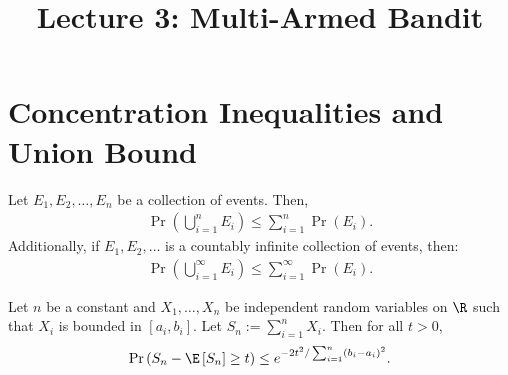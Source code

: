 \newcommand{\Regret}{\operatorname{Regret}}


\title{Lecture 3: Multi-Armed Bandit}


\section{Concentration Inequalities and Union Bound}

\begin{theorem}
\label{theorem:The union bound}
Let $E_1, E_2, \ldots, E_n$ be a collection of events. Then,
\begin{align*}
\Pr\left(\bigcup_{i=1}^n E_i\right) \leq \sum_{i=1}^n \Pr\left(E_i\right)
.
\end{align*}
Additionally, if $E_1, E_2, \ldots$ is a countably infinite collection of events, then:
\begin{align*}
\Pr\left(\bigcup_{i=1}^{\infty} E_i\right) \leq \sum_{i=1}^{\infty} \Pr\left(E_i\right)
.
\end{align*}
\end{theorem}

\begin{theorem}
\label{theorem:Hoeffding's inequality}
Let $n$ be a constant and $X_1, \ldots, X_n$ be independent random variables on $\R$ such that $X_i$ is bounded in $\left[a_i, b_i\right]$. Let $S_n:=\sum_{i=1}^n X_i$. Then for all $t>0$,
\begin{align*}
\Pr\left(S_n-\E\left[S_n\right] \geq t\right) \leq e^{-2 t^2 / \sum_{i=1}^n\left(b_i-a_i\right)^2}.
\end{align*}
\end{theorem}

